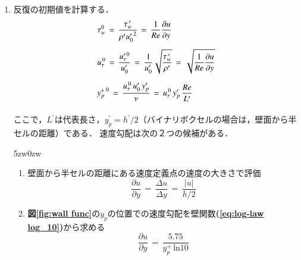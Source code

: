 \begin{enumerate}
\item 反復の初期値を計算する．
\begin{equation}
\begin{array}{l}
\vspace{3mm}
\displaystyle{ \tau_w^0 \,=\, \frac{\tau_w^{\,\prime}}{\rho^{\prime} {u_0^{\prime}}^2} \,=\, \frac{1}{Re} \frac{\partial u}{\partial y} }\\
\vspace{3mm}
\displaystyle{ u_{\tau}^{\,0} \,=\, \frac{u_{\tau}^{\prime\,0}}{u_0^{\prime}} \,=\, \frac{1}{u_0^{\prime}} \sqrt{\frac{\tau_w^{\,\prime}}{\rho^{\prime}}}
\,=\, \sqrt{\frac{1}{Re} \frac{\partial u}{\partial y}} }\\
\vspace{3mm}
\displaystyle{ {y_p^+}^{\,0} \,=\, \frac{u_{\tau}^{\,0} \, u_0^{\prime} \, y_p^{\prime} }{\nu} }
\,=\, u_{\tau}^{\,0} \, y_p^{\prime} \, \frac{Re}{L^{\prime}}\\
\end{array}
\label{eq:initial iteration fric vel}
\end{equation}
ここで，$L^{\prime}$は代表長さ，$y_p^{\prime}=h^{\prime}/2$（バイナリボクセルの場合は，壁面から半セルの距離）である．
速度勾配は次の２つの候補がある．
\vspace{1mm}

\begin{indentation}{5zw}{0zw}

\begin{enumerate}
\item 壁面から半セルの距離にある速度定義点の速度の大きさで評価
\begin{equation}
\frac{\partial u}{\partial y}  \,=\, \frac{\Delta u}{\Delta y} \,=\, \frac{|u|}{h/2}
\label{eq:vel mag wall func}
\end{equation}

\item \textbf{図\ref{fig:wall func}}の$y_p$の位置での速度勾配を壁関数\textbf{(\ref{eq:log-law log_10})}から求める
\begin{equation}
\frac{\partial u}{\partial y}  \,=\, \frac{5.75}{y_p^+ \, \mathrm{ln}10}
\label{eq:dudy wall func}
\end{equation}

\end{enumerate}

\end{indentation}

\vspace{2mm}


\end{enumerate}
